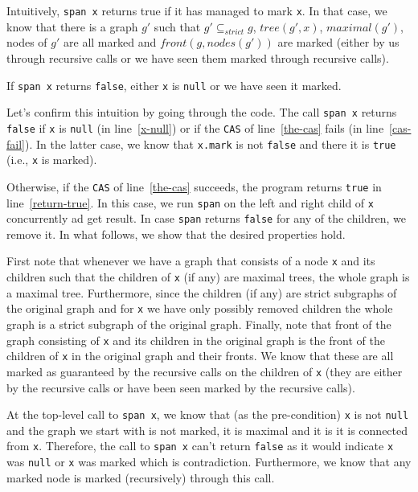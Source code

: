 \documentclass[nocopyrightspace]{sigplanconf}
\def\MyMLe{\lstinline[language=MyML, basicstyle=\small\ttfamily]}
\newcommand{\nodes}{\mathit{nodes}}
\newcommand{\front}{\mathit{front}}
\newcommand{\maximal}{\mathit{maximal}}
\newcommand{\tree}{\mathit{tree}}
\newcommand{\strictSG}{\subseteq_{\mathit{strict}}}
\begin{document}
Intuitively, \MyMLe{span x} returns true if it has managed to mark \MyMLe{x}.
In that case, we know that there is a graph $g'$ such that
$g' \strictSG g$, $\tree(g', x)$, $\maximal(g')$, nodes of $g'$ are all marked and $\front(g, \nodes(g'))$ are marked (either by us through recursive calls or we have seen them marked through recursive calls).

If \MyMLe{span x} returns \MyMLe{false}, either \MyMLe{x} is \MyMLe{null} or we have seen it marked.

Let's confirm this intuition by going through the code.
The call \MyMLe{span x} returns \MyMLe{false} if \MyMLe{x} is \MyMLe{null}
(in line~\ref{x-null}) or if the \MyMLe{CAS} of line~\ref{the-cas} fails (in line~\ref{cas-fail}).
In the latter case, we know that \MyMLe{x.mark} is not \MyMLe{false} and there it
is \MyMLe{true} (i.e., \MyMLe{x} is marked).

Otherwise, if the \MyMLe{CAS} of line~\ref{the-cas} succeeds, the program returns \MyMLe{true} in line~\ref{return-true}.
In this case, we run \MyMLe{span} on the left and right child of \MyMLe{x} concurrently ad get result.
In case \MyMLe{span} returns \MyMLe{false} for any of the children, we remove it.
In what follows, we show that the desired properties hold.

First note that whenever we have a graph that consists of a node \MyMLe{x} and its children such that
 the children of \MyMLe{x} (if any) are maximal trees, the whole graph is a maximal tree.
Furthermore, since the children (if any) are strict subgraphs of the original graph
and for \MyMLe{x} we have only possibly removed children the whole graph
is a strict subgraph of the original graph.
Finally, note that front of the graph consisting of \MyMLe{x} and its children in the original graph is
the front of the children of \MyMLe{x} in the original graph and their fronts.
We know that these are all marked as guaranteed by the recursive calls on the children of \MyMLe{x} (they are either by the recursive calls or have been seen marked by the recursive calls).

At the top-level call to \MyMLe{span x}, we know that (as the pre-condition) \MyMLe{x} is not \MyMLe{null} and the graph we start with is not marked, it is maximal and it is it is connected from \MyMLe{x}.
Therefore, the call to \MyMLe{span x} can't return \MyMLe{false} as it would indicate \MyMLe{x} was \MyMLe{null} or \MyMLe{x} was marked which is contradiction.
Furthermore, we know that any marked node is marked (recursively) through this call.
\end{document}
